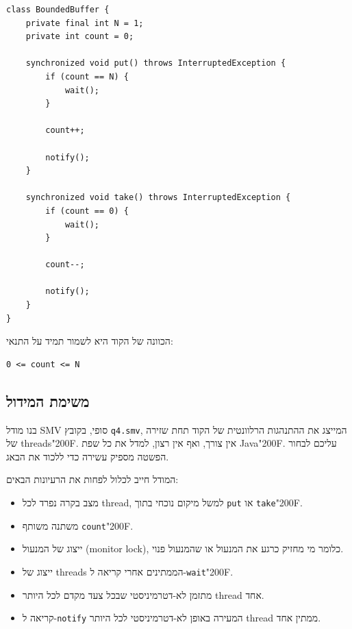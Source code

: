 \documentclass[11pt,a4paper]{article}
\newcommand{\RLM}{\char"200F}
\newenvironment{englishlisting}
  {\begin{english}\begin{flushleft}}
  {\end{flushleft}\end{english}}
\begin{document}
\begin{englishlisting}
\begin{lstlisting}
class BoundedBuffer {
    private final int N = 1;
    private int count = 0;

    synchronized void put() throws InterruptedException {
        if (count == N) {
            wait();
        }

        count++;

        notify();
    }

    synchronized void take() throws InterruptedException {
        if (count == 0) {
            wait();
        }

        count--;

        notify();
    }
}
\end{lstlisting}
\end{englishlisting}

הכוונה של הקוד היא לשמור תמיד על התנאי:
\begin{englishlisting}
\begin{lstlisting}
0 <= count <= N
\end{lstlisting}
\end{englishlisting}

\subsection*{משימת המידול}
בנו מודל \textenglish{SMV} סופי, בקובץ \texttt{q4.smv}, המייצג את ההתנהגות הרלוונטית של הקוד תחת שזירה של \textenglish{threads}\RLM.
אין צורך, ואף אין רצון, למדל את כל שפת \textenglish{Java}\RLM. עליכם לבחור הפשטה מספיק עשירה כדי ללכוד את הבאג.

המודל חייב לכלול לפחות את הרעיונות הבאים:
\begin{itemize}
  \item מצב בקרה נפרד לכל \textenglish{thread}, למשל מיקום נוכחי בתוך \texttt{put} או \texttt{take}\RLM.
  \item משתנה משותף \texttt{count}\RLM.
  \item ייצוג של המנעול \textenglish{(monitor lock)}, כלומר מי מחזיק כרגע את המנעול או שהמנעול פנוי.
  \item ייצוג של \textenglish{threads} הממתינים אחרי קריאה ל-\texttt{wait}\RLM.
  \item מתזמן לא-דטרמיניסטי שבכל צעד מקדם לכל היותר \textenglish{thread} אחד.
  \item קריאה ל-\texttt{notify} המעירה באופן לא-דטרמיניסטי לכל היותר \textenglish{thread} ממתין אחד.
\end{itemize}
\end{document}
